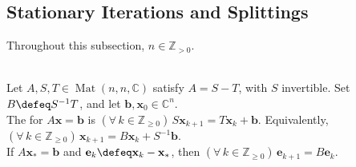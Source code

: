 \subsection{Stationary Iterations and Splittings}

Throughout this subsection, $n\in\mathbb{Z}_{>0}$.

\begin{definition} \label{def:matrix-splitting-iteration} \\
Let $A,S,T\in\operatorname{Mat}(n,n,\mathbb{C})$ satisfy $A=S-T$, with $S$ invertible. Set $B\defeq S^{-1}T$, and let $\mathbf{b},\mathbf{x}_0\in\mathbb{C}^n$.\\
The  for $A\mathbf{x}=\mathbf{b}$ is $(\forall\,k\in\mathbb{Z}_{\geq0})\,S\mathbf{x}_{k+1}=T\mathbf{x}_k+\mathbf{b}$. Equivalently, $(\forall\,k\in\mathbb{Z}_{\geq0})\,\mathbf{x}_{k+1}=B\mathbf{x}_k+S^{-1}\mathbf{b}$.\\
If $A\mathbf{x}_*=\mathbf{b}$ and $\mathbf{e}_k\defeq\mathbf{x}_k-\mathbf{x}_*$, then $(\forall\,k\in\mathbb{Z}_{\geq0})\,\mathbf{e}_{k+1}=B\mathbf{e}_k$.
\end{definition}


